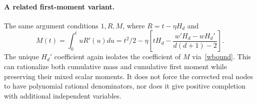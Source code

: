 \documentclass[11pt]{article}
\begin{document}
\paragraph{A related first-moment variant.}
The same argument conditions $1,R,M$, where
$R=t-\eta H_d$ and
\[
 M(t)=\int_0^t uR'(u)du
 =t^2/2-\eta\left[tH_d-
       \frac{w'H_d-wH_d'}{d(d+1)-2}\right].
\]
The unique $H_d'$ coefficient again isolates the coefficient of $M$
via~\eqref{wbound}. This can rationalize both cumulative mass and
cumulative first moment while preserving their mixed scalar moments.
It does not force the corrected real nodes to have polynomial rational
denominators, nor does it give positive completion with additional
independent variables.
\end{document}
